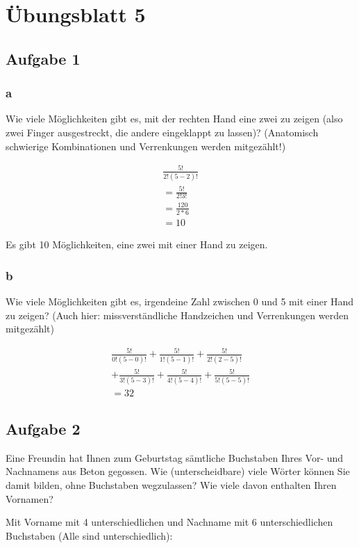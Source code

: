 \chapter{Übungsblatt 5}

\section{Aufgabe 1}

\subsection{a}
Wie viele Möglichkeiten gibt es, mit der rechten Hand eine zwei zu zeigen (also
zwei Finger ausgestreckt, die andere eingeklappt zu lassen)? (Anatomisch
schwierige Kombinationen und Verrenkungen werden mitgezählt!)

\begin{align*}
    \frac{5!}{2!(5-2)!} \\
    = \frac{5!}{2!3!}   \\
    = \frac{120}{2*6}   \\
    = 10
\end{align*}

Es gibt 10 Möglichkeiten, eine zwei mit einer Hand zu zeigen.

\subsection{b}
Wie viele Möglichkeiten gibt es, irgendeine Zahl zwischen 0 und 5 mit einer
Hand zu zeigen? (Auch hier: missverständliche Handzeichen und Verrenkungen
werden mitgezählt)

\begin{align*}
    \frac{5!}{0!(5-0)!} + \frac{5!}{1!(5-1)!} + \frac{5!}{2!(2-5)!}   \\
    + \frac{5!}{3!(5-3)!} + \frac{5!}{4!(5-4)!} + \frac{5!}{5!(5-5)!} \\
    = 32
\end{align*}

\section{Aufgabe 2}
Eine Freundin hat Ihnen zum Geburtstag sämtliche Buchstaben Ihres Vor- und
Nachnamens aus Beton gegossen. Wie (unterscheidbare) viele Wörter können Sie
damit bilden, ohne Buchstaben wegzulassen? Wie viele davon enthalten Ihren
Vornamen?

Mit Vorname mit 4 unterschiedlichen und Nachname mit 6 unterschiedlichen
Buchstaben (Alle sind unterschiedlich):

